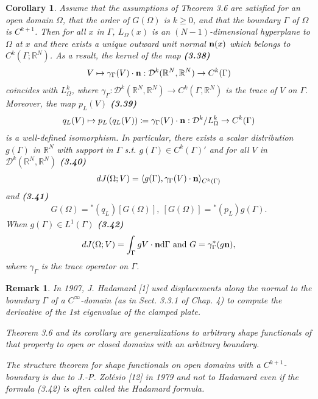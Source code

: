 \documentclass[oneside]{book}
\numberwithin{equation}{section}
\newtheorem{corollary}{Corollary}[section]
\newtheorem{remark}{Remark}[section]
\begin{document}
\begin{corollary}
    Assume that the assumptions of Theorem 3.6 are satisfied for an open domain $\Omega$, that the order of $G(\Omega)$ is $k\ge 0$, and that the boundary $\Gamma$ of $\Omega$ is $C^{k+1}$. Then for all $x$ in $\Gamma$, $L_\Omega(x)$ is an $(N - 1)$-dimensional hyperplane to $\Omega$ at $x$ and there exists a unique outward unit normal ${\bf n}(x)$ which belongs to $C^k(\Gamma;\mathbb{R}^N)$. As a result, the kernel of the map \textbf{(3.38)}
    \begin{align*}
        V\mapsto\gamma_\Gamma(V)\cdot{\bf n}:\mathcal{D}^k(\mathbb{R}^N,\mathbb{R}^N)\to C^k(\Gamma)
    \end{align*}
    coincides with $L_\Omega^k$, where $\gamma_\Gamma:\mathcal{D}^k(\mathbb{R}^N,\mathbb{R}^N)\to C^k(\Gamma,\mathbb{R}^N)$ is the trace of $V$ on $\Gamma$. Moreover, the map $p_L(V)$ \textbf{(3.39)}
    \begin{align*}
        q_L(V)\mapsto p_L\left(q_L(V)\right)\coloneqq\gamma_\Gamma(V)\cdot{\bf n}:\mathcal{D}^k/L_\Omega^k\to C^k(\Gamma)
    \end{align*}
    is a well-defined isomorphism. In particular, there exists a scalar distribution $g(\Gamma)$ in $\mathbb{R}^N$ with support in $\Gamma$ s.t. $g(\Gamma)\in C^k(\Gamma)'$ and for all $V$ in $\mathcal{D}^k(\mathbb{R}^N,\mathbb{R}^N)$ \textbf{(3.40)}
    \begin{align*}
        dJ(\Omega;V) = \langle g(\Gamma),\gamma_\Gamma(V)\cdot{\bf n}\rangle_{C^k(\Gamma)}
    \end{align*}
    and \textbf{(3.41)}
    \begin{align*}
        G(\Omega) = {}^*(q_L)[G(\Omega)],\ [G(\Omega)] = {}^*(p_L)g(\Gamma).
    \end{align*}
    When $g(\Gamma)\in L^1(\Gamma)$ \textbf{(3.42)}
    \begin{align*}
        dJ(\Omega;V) = \int_\Gamma gV\cdot{\bf n}{\rm d}\Gamma \mbox{ and } G = \gamma_\Gamma^*(g{\bf n}),
    \end{align*}
    where $\gamma_\Gamma$ is the trace operator on $\Gamma$.
\end{corollary}

\begin{remark}
    In 1907, J. Hadamard [1] used displacements along the normal to the boundary $\Gamma$ of a $C^\infty$-domain (as in Sect. 3.3.1 of Chap. 4) to compute the derivative of the 1st eigenvalue of the clamped plate.
    
    Theorem 3.6 and its corollary are generalizations to arbitrary shape functionals of that property to open or closed domains with an arbitrary boundary.
    
    The structure theorem for shape functionals on open domains with a $C^{k+1}$-boundary is due to J.-P. Zolésio [12] in 1979 and not to Hadamard even if the formula (3.42) is often called the \emph{Hadamard formula}.
\end{remark}
\end{document}
